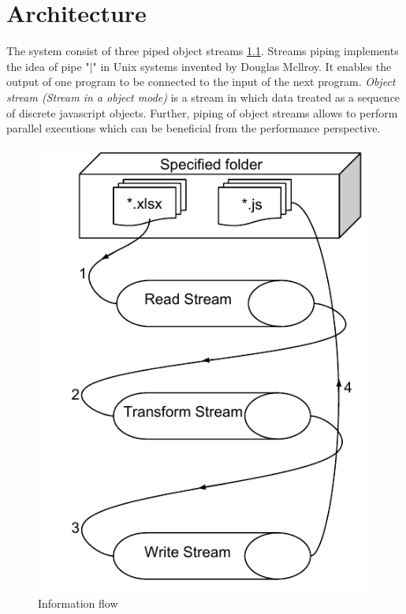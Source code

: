 \chapter{Architecture} 
\label{chap:architectureDesign}

The system consist of three piped object streams \ref{fig:tsGenArch}. Streams piping implements the idea of pipe "$|$" in Unix systems invented by Douglas Mcllroy. It enables the output of one program to be connected to the input of the next program. \textit{Object stream (Stream in a object mode)} is a stream in which data treated as a sequence of discrete javascript objects. Further, piping of object streams allows to perform parallel executions which can be beneficial from the performance perspective. 

\begin{figure}[ht]
	\label{fig:tsGenArch}
	\centering
	\includegraphics[scale=0.75]{grafiken/TSGeneratorArchitecture}
	\caption{Information flow}
\end{figure}

